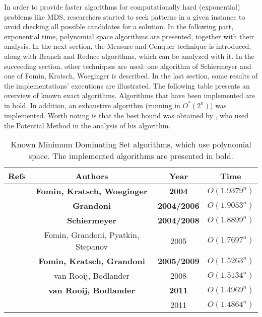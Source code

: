 In order to provide faster algorithms for computationally hard (exponential) problems like MDS, researchers started to seek patterns in a given instance to avoid checking all possible candidates for a solution.
In the following part, exponential time, polynomial space algorithms are presented, together with their analysis. In the next section, the Measure and Conquer technique is introduced, along with Branch and Reduce algorithms, which can be analyzed with it. In the succeeding section, other techniques are used: one algorithm of Schiermeyer and one of Fomin, Kratsch, Woeginger is described. In the last section, some results of the implementations' executions are illustrated. The following table presents an overview of known exact algorithms. Algorithms that have been implemented are in bold. In addition, an exhaustive algorithm (running in $O^*(2^n)$) was implemented. Worth noting is that the best bound was obtained by \citeauthor{iwata10.1007/978-3-642-28050-4_4}, who used the Potential Method in the analysis of his algorithm.
\begin{table}[ht]
    \centering
    \begin{tabular}{c|c|c|c}
        \textbf{Refs} & \textbf{Authors} & \textbf{Year} & \textbf{Time} \\ \hline
        \textbf{\cite{FominKratschWoeginger10.1007/978-3-540-30559-0_21}} & \textbf{Fomin, Kratsch, Woeginger} & \textbf{2004} & $O(1.9379^n)$\\
        \textbf{\cite{grandoni2004,GRANDONI2006209}} & \textbf{Grandoni} & \textbf{2004/2006} & $O(1.9053^n)$\\
        \textbf{\cite{schiermeyer2004,SCHIERMEYER20083291}} & \textbf{Schiermeyer} & \textbf{2004/2008} & $O(1.8899^n)$\\
        \cite{fgps10.1007/11602613_58} & Fomin, Grandoni, Pyatkin, Stepanov & 2005 & $O(1.7697^n)$ \\
        \textbf{\cite{DBLP:journals/eatcs/FominGK05,10.1007/11523468_16,10.1145/1552285.1552286}} & \textbf{Fomin, Kratsch, Grandoni} & \textbf{2005/2009} & $O(1.5263^n)$\\
        \cite{vanrooij2008design} & van Rooij, Bodlander & 2008 & $O(1.5134^n)$ \\
        \textbf{\cite{VANROOIJ20112147}} & \textbf{van Rooij, Bodlander} & \textbf{2011} & $O(1.4969^n)$ \\
        \cite{iwata10.1007/978-3-642-28050-4_4} & \citeauthor{iwata10.1007/978-3-642-28050-4_4} & 2011 & $O(1.4864^n)$
    \end{tabular}
    \caption{Known Minimum Dominating Set algorithms, which use polynomial space. The implemented algorithms are presented in bold.}
\end{table}
